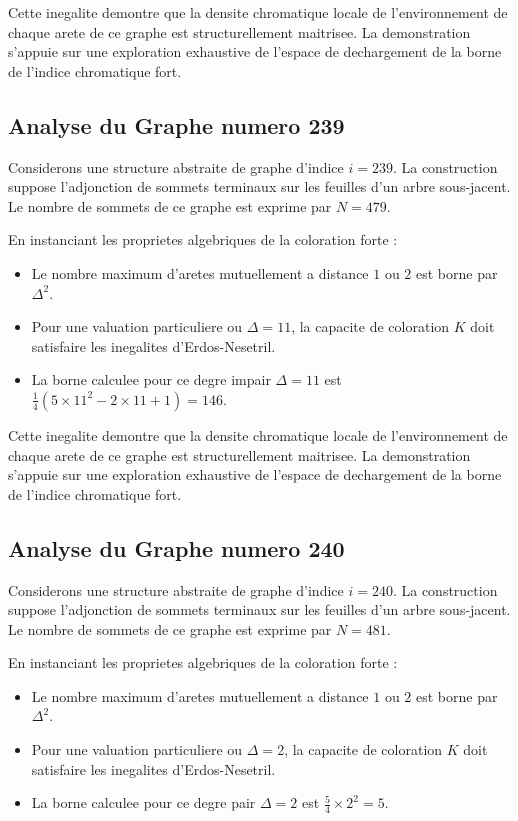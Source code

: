 \documentclass[11pt,a4paper]{article}
\begin{document}
Cette inegalite demontre que la densite chromatique locale de l'environnement de chaque arete de ce graphe est structurellement maitrisee. La demonstration s'appuie sur une exploration exhaustive de l'espace de dechargement de la borne de l'indice chromatique fort.

\subsection{Analyse du Graphe numero 239}
Considerons une structure abstraite de graphe d'indice $i = 239$. La construction suppose l'adjonction de sommets terminaux sur les feuilles d'un arbre sous-jacent. Le nombre de sommets de ce graphe est exprime par $N = 479$.

En instanciant les proprietes algebriques de la coloration forte :
\begin{itemize}
\item Le nombre maximum d'aretes mutuellement a distance $1$ ou $2$ est borne par $\Delta^2$.
\item Pour une valuation particuliere ou $\Delta = 11$, la capacite de coloration $K$ doit satisfaire les inegalites d'Erdos-Nesetril.
\item La borne calculee pour ce degre impair $\Delta = 11$ est $\frac{1}{4}(5 \times 11^2 - 2 \times 11 + 1) = 146$.
\end{itemize}

Cette inegalite demontre que la densite chromatique locale de l'environnement de chaque arete de ce graphe est structurellement maitrisee. La demonstration s'appuie sur une exploration exhaustive de l'espace de dechargement de la borne de l'indice chromatique fort.

\subsection{Analyse du Graphe numero 240}
Considerons une structure abstraite de graphe d'indice $i = 240$. La construction suppose l'adjonction de sommets terminaux sur les feuilles d'un arbre sous-jacent. Le nombre de sommets de ce graphe est exprime par $N = 481$.

En instanciant les proprietes algebriques de la coloration forte :
\begin{itemize}
\item Le nombre maximum d'aretes mutuellement a distance $1$ ou $2$ est borne par $\Delta^2$.
\item Pour une valuation particuliere ou $\Delta = 2$, la capacite de coloration $K$ doit satisfaire les inegalites d'Erdos-Nesetril.
\item La borne calculee pour ce degre pair $\Delta = 2$ est $\frac{5}{4} \times 2^2 = 5$.
\end{itemize}
\end{document}
